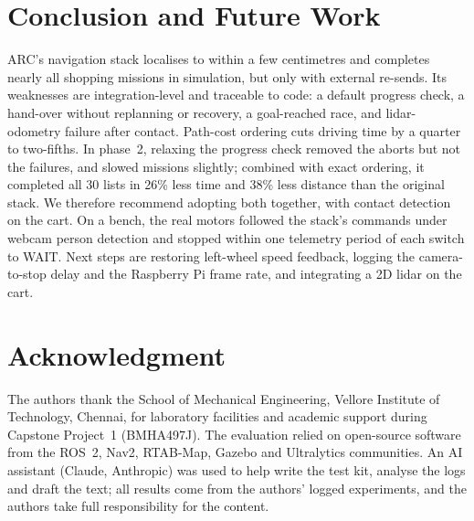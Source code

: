 \documentclass[conference]{IEEEtran}
\begin{document}
\section{Conclusion and Future Work}
ARC's navigation stack localises to within a few centimetres and completes nearly all shopping missions in simulation, but only with external re-sends. Its weaknesses are integration-level and traceable to code: a default progress check, a hand-over without replanning or recovery, a goal-reached race, and lidar-odometry failure after contact. Path-cost ordering cuts driving time by a quarter to two-fifths. In phase~2, relaxing the progress check removed the aborts but not the failures, and slowed missions slightly; combined with exact ordering, it completed all 30 lists in 26\% less time and 38\% less distance than the original stack. We therefore recommend adopting both together, with contact detection on the cart. On a bench, the real motors followed the stack's commands under webcam person detection and stopped within one telemetry period of each switch to WAIT. Next steps are restoring left-wheel speed feedback, logging the camera-to-stop delay and the Raspberry Pi frame rate, and integrating a 2D lidar on the cart.

\section*{Acknowledgment}
The authors thank the School of Mechanical Engineering, Vellore Institute of Technology, Chennai, for laboratory facilities and academic support during Capstone Project~1 (BMHA497J). The evaluation relied on open-source software from the ROS~2, Nav2, RTAB-Map, Gazebo and Ultralytics communities. An AI assistant (Claude, Anthropic) was used to help write the test kit, analyse the logs and draft the text; all results come from the authors' logged experiments, and the authors take full responsibility for the content.
\end{document}
